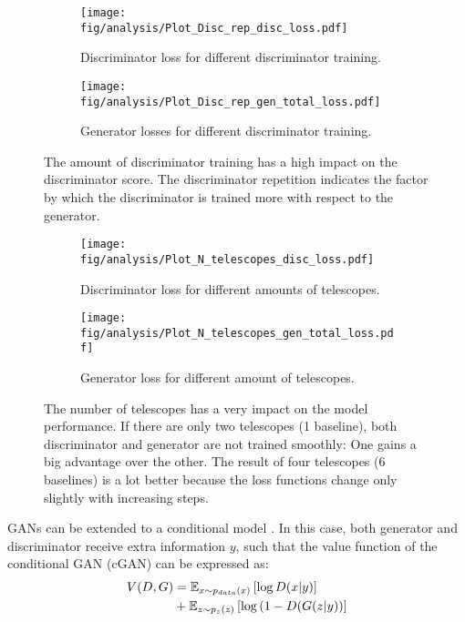 \begin{figure*}
	\centering
	\begin{subfigure}{0.5\linewidth}
		\centering
		\texttt{[image: fig/analysis/Plot\_Disc\_rep\_disc\_loss.pdf]}
		\caption{Discriminator loss for different discriminator training.}
		\label{fig:Plot_discrep_discloss}
	\end{subfigure}\hfill
	\begin{subfigure}{0.5\linewidth}
		\centering
		\texttt{[image: fig/analysis/Plot\_Disc\_rep\_gen\_total\_loss.pdf]}
		\caption{Generator losses for different discriminator training.}
		\label{fig:Plot_discrep_genloss}
	\end{subfigure}\hfill
	\caption{The amount of discriminator training has a high impact on the discriminator score. The discriminator repetition indicates the factor by which the discriminator is trained more with respect to the generator.}
	\label{fig:Plot_discrep_loss}
\end{figure*}
\begin{figure*}
	\centering
	\begin{subfigure}{0.5\linewidth}
		\centering
		\texttt{[image: fig/analysis/Plot\_N\_telescopes\_disc\_loss.pdf]}
		\caption{Discriminator loss for different amounts of telescopes.}
		\label{fig:Plot_telescopes_discloss}
	\end{subfigure}\hfill
	\begin{subfigure}{0.5\linewidth}
		\centering
		\texttt{[image: fig/analysis/Plot\_N\_telescopes\_gen\_total\_loss.pdf]}
		\caption{Generator loss for different amount of telescopes.}
		\label{fig:Plot_telescopes_genloss}
	\end{subfigure}\hfill
	\caption{The number of telescopes has a very impact on the model performance. If there are only two telescopes (1 baseline), both discriminator and generator are not trained smoothly: One gains a big advantage over the other. The result of four telescopes (6 baselines) is a lot better because the loss functions change only slightly with increasing steps.}
	\label{fig:Plot_telescopes_loss}
\end{figure*}
GANs can be extended to a conditional model \cite{mirza2014conditional}. In this case, both generator and discriminator receive extra information $y$, such that the value function of the conditional GAN (cGAN) can be expressed as:
\begin{equation}
	\centering
	\begin{aligned}
		V(D, G) &= \mathbb{E}_{x \sim p_{data}(x)} \left[ \log D(x|y) \right] \\
		&+ \mathbb{E}_{z \sim p_{z}(z)} \left[ \log \left( 1-D(G(z|y) \right) \right]
	\end{aligned}
	\label{eq:conditional_GAN}
\end{equation}

